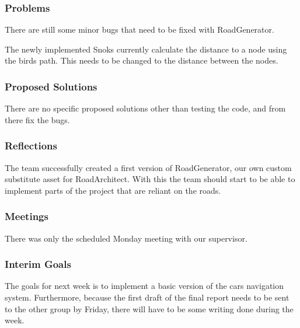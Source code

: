 \subsubsection{Problems}

There are still some minor bugs that need to be fixed with RoadGenerator.

The newly implemented Snoks currently calculate the distance to a node using the birds path. This needs to be changed to the distance between the nodes. 

\subsubsection{Proposed Solutions}

There are no specific proposed solutions other than testing the code, and from there fix the bugs.


\subsubsection{Reflections}

The team successfully created a first version of RoadGenerator, our own custom substitute asset for RoadArchitect. With this the team should start to be able to implement parts of the project that are reliant  on the roads. 

\subsubsection{Meetings}

There was only the scheduled Monday meeting with our supervisor.

\subsubsection{Interim Goals}

The goals for next week is to implement a basic version of the cars navigation system. Furthermore, because the first draft of the final report needs to be sent to the other group by Friday, there will have to be some writing done during the week.

